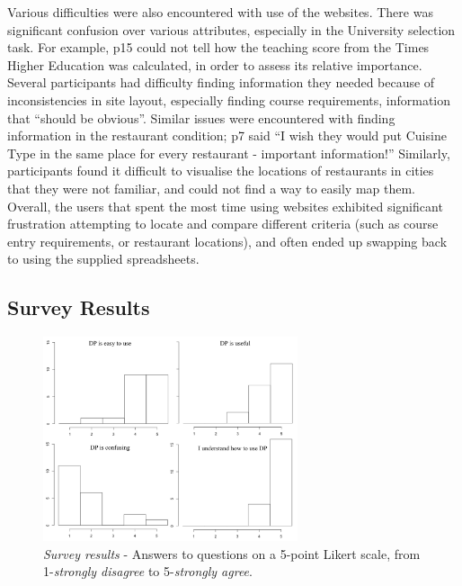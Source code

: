 \documentclass{sigchi}
\begin{document}

Various difficulties were also encountered with use of the websites. There was significant confusion over various attributes, especially in the University selection task.  For example, p15 could not tell how the teaching score from the Times Higher Education was calculated, in order to assess its relative importance.  Several participants had difficulty finding information they needed because of inconsistencies in site layout, especially finding course requirements, information that ``should be obvious''.  Similar issues were encountered with finding information in the restaurant condition; p7 said ``I wish they would put Cuisine Type in the same place for every restaurant - important information!'' Similarly, participants found it difficult to visualise the locations of restaurants in cities that they were not familiar, and could not find a way to easily map them. Overall, the users that spent the most time using websites exhibited significant frustration attempting to locate and compare different criteria (such as course entry requirements, or restaurant locations), and often ended up swapping back to using the supplied spreadsheets.



\subsection{Survey Results}

\begin{figure}[tbp]
\begin{center}
\includegraphics[width=7.5cm]{img/survey}
\caption{\emph{Survey results} - Answers to questions on a 5-point Likert scale, from 1-\emph{strongly disagree} to 5-\emph{strongly agree}.}
\label{fig:survey}
\end{center}
\end{figure}
\end{document}
